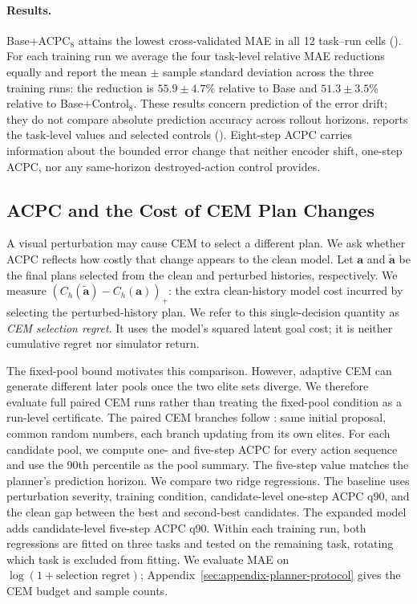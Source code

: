 \documentclass[10pt]{article}
\begin{document}
\paragraph{Results.}
Base+ACPC$_8$ attains the lowest cross-validated MAE in all 12 task--run cells
(). For each training run we average the four
task-level relative MAE reductions equally and report the mean $\pm$ sample
standard deviation across the three training runs: the
reduction is $55.9\pm4.7\%$ relative to Base and $51.3\pm3.5\%$ relative to
Base+Control$_8$. These results concern prediction of the error drift; they
do not compare absolute prediction accuracy across rollout horizons.
 reports the task-level values and selected controls
(). Eight-step
ACPC carries information about the bounded error change that neither encoder
shift, one-step ACPC, nor any same-horizon destroyed-action control provides.

\subsection{ACPC and the Cost of CEM Plan Changes}\label{sec:exp-planner}

A visual perturbation may cause CEM to select a different plan. We ask whether
ACPC reflects how costly that change appears to the clean model.
Let $\mathbf a$ and $\tilde{\mathbf a}$ be the final plans selected from the
clean and perturbed histories, respectively. We measure
$(C_h(\tilde{\mathbf a})-C_h(\mathbf a))_+$: the extra clean-history model
cost incurred by selecting the perturbed-history plan. We refer to this
single-decision quantity as \emph{CEM selection regret}. It uses the model's
squared latent goal cost; it is neither cumulative regret nor simulator
return.

The fixed-pool bound motivates this comparison. However, adaptive CEM can
generate different later pools once the two elite sets diverge. We therefore
evaluate full paired CEM runs rather than treating the fixed-pool condition as
a run-level certificate.
The paired CEM branches follow : same
initial proposal, common random numbers, each branch updating from its own
elites. For each candidate pool, we compute one- and five-step ACPC for every
action sequence and use the 90th percentile as the pool summary. The
five-step value matches the planner's prediction horizon. We compare two
ridge regressions. The baseline uses perturbation severity, training
condition, candidate-level one-step ACPC q90, and the clean gap between the
best and second-best candidates. The expanded model adds candidate-level
five-step ACPC q90. Within each training run, both regressions are fitted on
three tasks and tested on the remaining task, rotating which task is excluded
from fitting. We evaluate MAE on
$\log(1+\text{selection regret})$; Appendix~\ref{sec:appendix-planner-protocol}
gives the CEM budget and sample counts.
\end{document}
